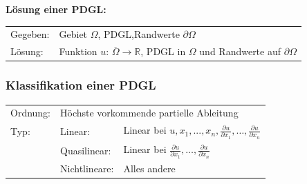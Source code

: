 \textbf{Lösung einer PDGL:}\\
\begin{tabular}{ll}
Gegeben:& Gebiet $\Omega$, PDGL,Randwerte $\partial\Omega$\\
Lösung:& Funktion $u$: $\overset{\_}{\Omega}\rightarrow \mathbb{R}$, PDGL in $\Omega$ und Randwerte auf $\partial\Omega$\\
\end{tabular}

\subsubsection{Klassifikation einer PDGL}
\begin{tabular}{lll}
Ordnung:& \multicolumn{2}{l}{Höchste vorkommende partielle Ableitung}\\
Typ:& Linear: & Linear bei $u, x_1,...,x_n, \frac{\partial u}{\partial x_1},\ldots,\frac{\partial u}{\partial x_n}$\\
& Quasilinear: &  Linear bei $\frac{\partial u}{\partial x_1},\ldots,\frac{\partial u}{\partial x_n}$\\
& Nichtlineare: & Alles andere
\end{tabular}








%



